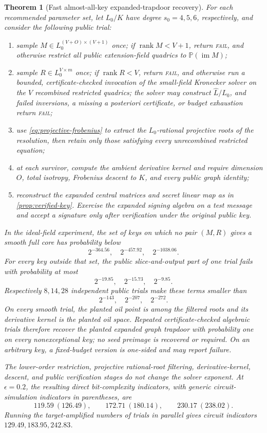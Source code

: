 \documentclass[10pt,a4paper]{article}
\newtheorem{theorem}{Theorem}[section]
\newcommand{\PP}{\mathbb P}
\newcommand{\rank}{\operatorname{rank}}
\begin{document}
\begin{theorem}[Fast almost-all-key expanded-trapdoor recovery]\label{thm:attack}
For each recommended parameter set, let $L_0/K$ have degree $s_0=4,5,6$, respectively, and consider the following public trial:
\begin{enumerate}
\item sample $M\in L_0^{(V+O)\times(V+1)}$ once; if $\rank M<V+1$, return \textnormal{\textsc{fail}}, and otherwise restrict all public extension-field quadrics to $\PP(\operatorname{im}M)$;
\item sample $R\in L_0^{V\times m}$ once; if $\rank R<V$, return \textnormal{\textsc{fail}}, and otherwise run a bounded, certificate-checked invocation of the small-field Kronecker solver on the $V$ recombined restricted quadrics; the solver may construct $\widehat L/L_0$, and failed inversions, a missing a posteriori certificate, or budget exhaustion return \textnormal{\textsc{fail}};
\item use \eqref{eq:projective-frobenius} to extract the $L_0$-rational projective roots of the resolution, then retain only those satisfying every unrecombined restricted equation;
\item at each survivor, compute the ambient derivative kernel and require dimension $O$, total isotropy, Frobenius descent to $K$, and every public graph identity;
\item reconstruct the expanded central matrices and secret linear map as in \cref{prop:verified-key}.  Exercise the expanded signing algebra on a test message and accept a signature only after verification under the original public key.
\end{enumerate}
In the ideal-field experiment, the set of keys on which no pair $(M,R)$ gives a smooth full core has probability below
\[
2^{-364.56},\quad2^{-457.92},\quad2^{-1038.06}.
\]
For every key outside that set, the public slice-and-output part of one trial fails with probability at most
\[
2^{-19.85},\quad2^{-15.73},\quad2^{-9.85}.
\]
Respectively $8,14,28$ independent public trials make these terms smaller than
\[
2^{-143},\quad2^{-207},\quad2^{-272}.
\]
On every smooth trial, the planted oil point is among the filtered roots and its derivative kernel is the planted oil space.  Repeated certificate-checked algebraic trials therefore recover the planted expanded graph trapdoor with probability one on every nonexceptional key; no seed preimage is recovered or required.  On an arbitrary key, a fixed-budget version is one-sided and may report failure.

The lower-order restriction, projective rational-root filtering, derivative-kernel, descent, and public verification stages do not change the solver exponent.  At $\epsilon=0.2$, the resulting direct bit-complexity indicators, with generic circuit-simulation indicators in parentheses, are
\[
119.59\ (126.49),\qquad172.71\ (180.14),\qquad230.17\ (238.02).
\]
Running the target-amplified numbers of trials in parallel gives circuit indicators $129.49,183.95,242.83$.
\end{theorem}
\end{document}
